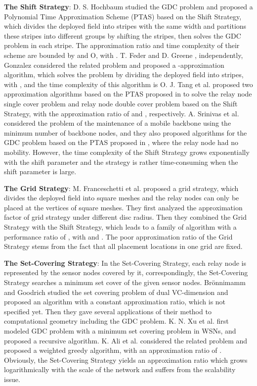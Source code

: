 \documentclass[journal]{IEEEtran}
\begin{document}
\textbf{The Shift Strategy}: D. S. Hochbaum \cite{Hochbaum85} \cite{Hochbaum97} studied the GDC problem and proposed a Polynomial Time
Approximation Scheme (PTAS) based on the Shift Strategy, which divides the deployed field into stripes with the same width and partitions
these stripes into different groups by shifting the stripes, then solves the GDC problem in each stripe. The approximation ratio and time complexity of their scheme are bounded by  and O, with . T. Feder and D. Greene \cite{Feder88}, independently, Gonzalez \cite{Gonzalez91} considered the
related problem and proposed a -approximation algorithm, which solves the problem by dividing the deployed field into stripes, with , and the time complexity of this algorithm is O. J. Tang et al. \cite{Tang06} proposed two approximation algorithms based on the PTAS proposed in \cite{Hochbaum85} \cite{Hochbaum97} to solve the relay node single cover problem and relay node double cover problem based on the Shift Strategy, with the approximation ratio of  and , respectively. A. Srinivas et al.
\cite{Srinivas09} considered the problem of the maintenance of a mobile backbone using the minimum number of backbone nodes, and they also
proposed algorithms for the GDC problem based on the PTAS proposed in \cite{Hochbaum85} \cite{Hochbaum97}, where the relay node had no mobility. However, the time complexity of the Shift Strategy grows exponentially with the shift parameter and the strategy is rather time-consuming when the shift parameter is large.

\textbf{The Grid Strategy}: M. Franceschetti et al. \cite{Franceschetti01} \cite{Franceschetti04} proposed a grid strategy, which divides
the deployed field into square meshes and the relay nodes can only be placed at the vertices of square meshes. They first analyzed the
approximation factor of grid strategy under different disc radius. Then they combined the Grid Strategy with the Shift Strategy, which
leads to a family of algorithm with a performance ratio of , with  and . The poor approximation ratio of the Grid Strategy stems from the fact that all placement locations in one grid are fixed.

\textbf{The Set-Covering Strategy}: In the Set-Covering Strategy, each relay node is represented by the sensor nodes covered by it, correspondingly,
the Set-Covering Strategy searches a minimum set cover of the given sensor nodes. Br\"{o}nnimamm and Goodrich \cite{Bronninamm95} studied the
set covering problem of dual VC-dimension and proposed an algorithm with a constant approximation ratio, which is not specified yet. Then
they gave several applications of their method to computational geometry including the GDC problem. K. N. Xu et al. \cite{Xu05} first modeled
GDC problem with a minimum set covering problem in WSNs, and proposed a recursive algorithm. K. Ali et al. \cite{Ali11} considered the related
problem and proposed a weighted greedy algorithm, with an approximation ratio of . Obviously, the Set-Covering Strategy yields an approximation ratio which grows logarithmically with the scale of the network and suffers from the scalability issue.
\end{document}
